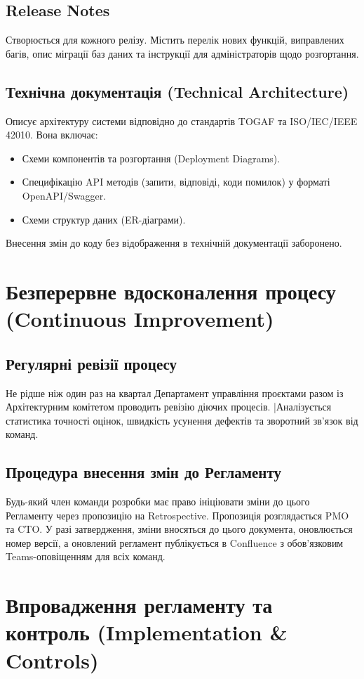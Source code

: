 \documentclass{article}
\begin{document}
\subsection{Release Notes}
Створюється для кожного релізу. Містить перелік нових функцій, виправлених багів, опис міграції баз даних та інструкції для адміністраторів щодо розгортання.

\subsection{Технічна документація (Technical Architecture)}
Описує архітектуру системи відповідно до стандартів TOGAF та ISO/IEC/IEEE 42010. Вона включає:
\begin{itemize}
    \item Схеми компонентів та розгортання (Deployment Diagrams).
    \item Специфікацію API методів (запити, відповіді, коди помилок) у форматі OpenAPI/Swagger.
    \item Схеми структур даних (ER-діаграми).
\end{itemize}
Внесення змін до коду без відображення в технічній документації заборонено.

\section{Безперервне вдосконалення процесу (Continuous Improvement)}

\subsection{Регулярні ревізії процесу}
Не рідше ніж один раз на квартал Департамент управління проєктами разом із Архітектурним комітетом проводить ревізію діючих процесів. |Аналізується статистика точності оцінок, швидкість усунення дефектів та зворотний зв'язок від команд.

\subsection{Процедура внесення змін до Регламенту}
Будь-який член команди розробки має право ініціювати зміни до цього Регламенту через пропозицію на Retrospective. Пропозиція розглядається PMO та CTO. У разі затвердження, зміни вносяться до цього документа, оновлюється номер версії, а оновлений регламент публікується в Confluence з обов'язковим Teams-оповіщенням для всіх команд.

\section{Впровадження регламенту та контроль (Implementation \& Controls)}
\end{document}
